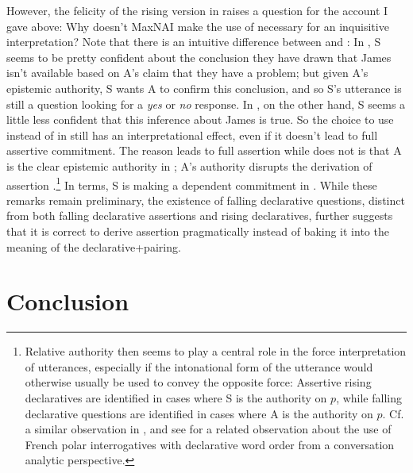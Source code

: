 \documentclass[output=paper,colorlinks,citecolor=brown]{langscibook}
\begin{document}
	However, the felicity of the rising version in  raises a question for the account I gave above: Why doesn't MaxNAI make the use of \rise necessary for an inquisitive interpretation? Note that there is an intuitive difference between  and : In , S seems to be pretty confident about the conclusion they have drawn that James isn't available based on A's claim that they have a problem; but given A's epistemic authority, S wants A to confirm this conclusion, and so S's utterance is still a question looking for a \emph{yes} or \emph{no} response. In , on the other hand, S seems a little less confident that this inference about James is true. So the choice to use \fall instead of \rise in  still has an interpretational effect, even if it doesn't lead to full assertive commitment. The reason  leads to full assertion while  does not is that A is the clear epistemic authority in ; A's authority disrupts the derivation of assertion .\footnote{Relative authority then seems to play a central role in the force interpretation of utterances, especially if the intonational form of the utterance would otherwise usually be used to convey the opposite force: Assertive rising declaratives are identified in cases where S is the authority on $p$, while falling declarative questions are identified in cases where A is the authority on $p$. Cf. a similar observation in \citet{jeong18}, and see \citet{hansen01} for a related observation about the use of French polar interrogatives with declarative word order from a conversation analytic perspective.} In  terms, S is making a dependent commitment in . While these remarks  remain preliminary, the existence of falling declarative questions, distinct from both falling declarative assertions and rising declaratives, further suggests that it is correct to derive assertion pragmatically instead of baking it into the meaning of the declarative+\fall pairing. 
	
	
	
\section{Conclusion} \label{sec:13:conclude}
	
\end{document}
